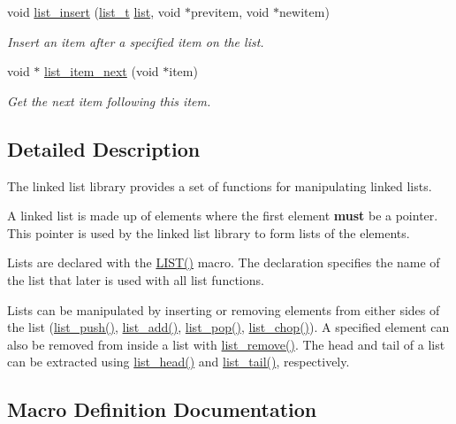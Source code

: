 \begin{DoxyCompactItemize}
\item 
void \hyperlink{group__list_gad7302f5e5b808b595535c034f2a41474}{list\+\_\+insert} (\hyperlink{group__list_ga9c248916bae1f0b13732686786be7108}{list\+\_\+t} \hyperlink{structlist}{list}, void $\ast$previtem, void $\ast$newitem)
\begin{DoxyCompactList}\small\item\em Insert an item after a specified item on the list. \end{DoxyCompactList}\item 
void $\ast$ \hyperlink{group__list_gae9c13698f6fd8620561f0d1124ec8cdf}{list\+\_\+item\+\_\+next} (void $\ast$item)
\begin{DoxyCompactList}\small\item\em Get the next item following this item. \end{DoxyCompactList}\end{DoxyCompactItemize}


\subsection{Detailed Description}
The linked list library provides a set of functions for manipulating linked lists.

A linked list is made up of elements where the first element {\bfseries must} be a pointer. This pointer is used by the linked list library to form lists of the elements.

Lists are declared with the \hyperlink{group__list_ga1e61a00c396ab8bd4141f54772e310ce}{L\+I\+S\+T()} macro. The declaration specifies the name of the list that later is used with all list functions.

Lists can be manipulated by inserting or removing elements from either sides of the list (\hyperlink{group__list_gaaa39517a2e9ec81c34e4740d43ea7150}{list\+\_\+push()}, \hyperlink{group__list_ga775c0dfc08dca991297df7b419b7be43}{list\+\_\+add()}, \hyperlink{group__list_ga846aef3d9db78d0755e6bb39e7da485e}{list\+\_\+pop()}, \hyperlink{group__list_ga34e6b487c378343356299f048f8011ad}{list\+\_\+chop()}). A specified element can also be removed from inside a list with \hyperlink{group__list_ga3eb717d9997a980e937e2ea8b0c07677}{list\+\_\+remove()}. The head and tail of a list can be extracted using \hyperlink{group__list_gacc0723982dcfcc54cfa6ba932ee63051}{list\+\_\+head()} and \hyperlink{group__list_ga4e96242bd922c2c7116b2e5a5ca7011b}{list\+\_\+tail()}, respectively. 

\subsection{Macro Definition Documentation}
\hypertarget{group__list_ga1e61a00c396ab8bd4141f54772e310ce}{}
